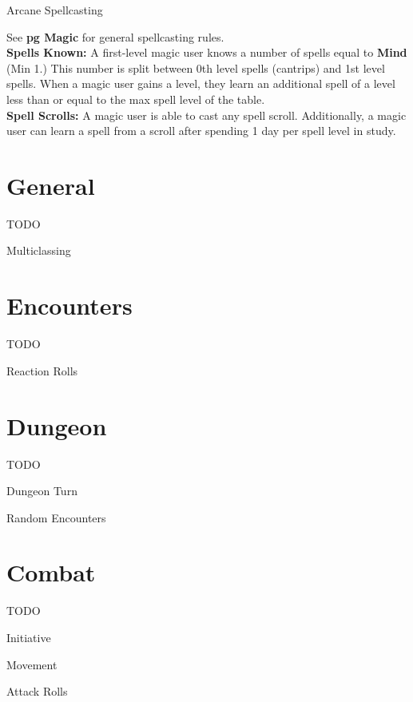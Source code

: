\documentclass[18pt]{article}
\begin{document}
\begin{multicols}{2}
\begin{mercHeading}
Arcane Spellcasting
\end{mercHeading}
See  \textbf{pg \pageref{section:GenMagicRules} Magic} for general spellcasting rules. \\
\textbf{Spells Known:} A first-level magic user knows a number of spells equal to \textbf{Mind} (Min 1.) This number is split between 0th level spells (cantrips) and 1st level spells. When a magic user gains a level, they learn an additional spell of a level less than or equal to the max spell level of the table. \vspace{2pt}\\ 
\textbf{Spell Scrolls:}
A magic user is able to cast any spell scroll. Additionally, a magic user can learn a spell from a scroll after spending 1 day per spell level in study.\\

\section*{General}
TODO
\begin{mercHeading}
Multiclassing
\end{mercHeading}
\section*{Encounters}
TODO
\begin{mercHeading}
Reaction Rolls
\end{mercHeading}
\section*{Dungeon}
TODO
\begin{mercHeading}
Dungeon Turn
\end{mercHeading}
\begin{mercHeading}
Random Encounters
\end{mercHeading}
\section*{Combat}
TODO
\begin{mercHeading}
Initiative 
\end{mercHeading}
\begin{mercHeading}
Movement
\end{mercHeading}
\begin{mercHeading}
Attack Rolls
\end{mercHeading}

\end{multicols}
\end{document}

